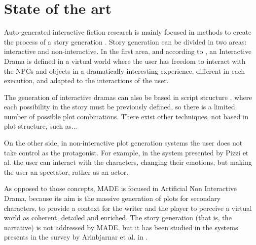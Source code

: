 \documentclass[runningheads]{llncs}
\begin{document}
\section{State of the art}
\label{sec:soa}


Auto-generated interactive fiction research is mainly focused in methods to create the process of a story generation \cite{nairat2011character}. Story generation can be divided in two areas: interactive and non-interactive. In the first area, and according to \cite{ReviewArinbjarnar09}, an Interactive Drama is defined in a virtual world where the user has freedom to interact with the NPCs and objects in a dramatically interesting experience, different in each execution, and adapted to the interactions of the user.


The generation of interactive dramas can also be based in script
structure \cite{ArchitectureYoung04}, where each possibility in the
story must be previously defined, so there is a limited number of
possible plot combinations. There exist other techniques, not based in
plot structure, such as... 



On the other side, in non-interactive plot generation systems the user does not take control as the protagonist. For example, in the system presented by Pizzi et al. \cite{pizzi2007interactive} the user can interact with the characters, changing their emotions, but making the user an spectator, rather as an actor.



As opposed to those concepts, MADE is focused in Artificial Non Interactive Drama, because its aim is the massive generation of plots for secondary characters, to provide a context for the writer and the player to perceive a virtual world as coherent, detailed and enriched. The story generation (that is, the narrative) is not addressed by MADE, but it has been studied in the systems presents in the survey by Arinbjarnar et al. in \cite{ReviewArinbjarnar09}.
\end{document}
